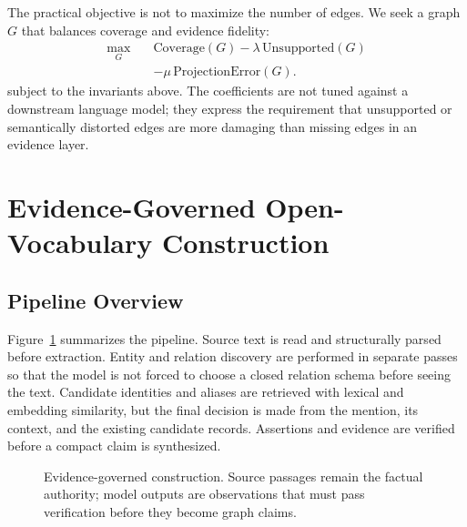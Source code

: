 \documentclass[11pt]{article}
\begin{document}
The practical objective is not to maximize the number of edges. We seek a graph $G$ that balances coverage and evidence fidelity:
\begin{equation}
\begin{aligned}
  \max_G\quad &\mathrm{Coverage}(G) - \lambda\,\mathrm{Unsupported}(G)\\
               &- \mu\,\mathrm{ProjectionError}(G).
\end{aligned}
\end{equation}
subject to the invariants above. The coefficients are not tuned against a downstream language model; they express the requirement that unsupported or semantically distorted edges are more damaging than missing edges in an evidence layer.

\section{Evidence-Governed Open-Vocabulary Construction}
\label{sec:method}

\subsection{Pipeline Overview}

Figure~\ref{fig:pipeline} summarizes the pipeline. Source text is read and structurally parsed before extraction. Entity and relation discovery are performed in separate passes so that the model is not forced to choose a closed relation schema before seeing the text. Candidate identities and aliases are retrieved with lexical and embedding similarity, but the final decision is made from the mention, its context, and the existing candidate records. Assertions and evidence are verified before a compact claim is synthesized.

\begin{figure}[t]
\centering
{}
\caption{Evidence-governed construction. Source passages remain the factual authority; model outputs are observations that must pass verification before they become graph claims.}
\label{fig:pipeline}
\end{figure}
\end{document}
